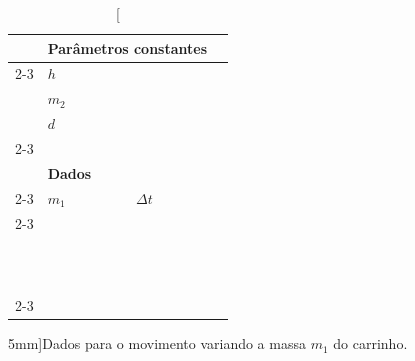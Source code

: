 \begin{table}[!ht]
\centering
\begin{tabular}{lp{25mm}p{25mm}l}
\toprule
	& \multicolumn{2}{l}{\textbf{Parâmetros constantes}} & \\
	\cmidrule{2-3}
	& $h$ \cellcolor[gray]{0.89} & \cellcolor[gray]{0.92} \\
	& $m_2$ \cellcolor[gray]{0.95} & \cellcolor[gray]{0.97} \\
	& $d$ \cellcolor[gray]{0.89} & \cellcolor[gray]{0.92} \\
	\cmidrule{2-3}
\\
	& \multicolumn{2}{l}{\textbf{Dados}} \\
	\cmidrule{2-3}
	& $m_1$ & $\Delta t$ & \\
	\cmidrule{2-3}
	& \cellcolor[gray]{0.89} & \cellcolor[gray]{0.92} \\
	& \cellcolor[gray]{0.95} & \cellcolor[gray]{0.97} \\
	& \cellcolor[gray]{0.89} & \cellcolor[gray]{0.92} \\
	& \cellcolor[gray]{0.95} & \cellcolor[gray]{0.97} \\
	& \cellcolor[gray]{0.89} & \cellcolor[gray]{0.92} \\
	& \cellcolor[gray]{0.95} & \cellcolor[gray]{0.97} \\
	& \cellcolor[gray]{0.89} & \cellcolor[gray]{0.92} \\
	& \cellcolor[gray]{0.95} & \cellcolor[gray]{0.97} \\
	& \cellcolor[gray]{0.89} & \cellcolor[gray]{0.92} \\
	& \cellcolor[gray]{0.95} & \cellcolor[gray]{0.97} \\
	& \cellcolor[gray]{0.89} & \cellcolor[gray]{0.92} \\
	& \cellcolor[gray]{0.95} & \cellcolor[gray]{0.97} \\
	\cmidrule{2-3}
\bottomrule
\end{tabular}
\caption[][5mm]{Dados para o movimento variando a massa $m_1$ do carrinho.}
\label{TabelaDadosEnergiaMecanica1}
\end{table}
\vspace{1cm}

